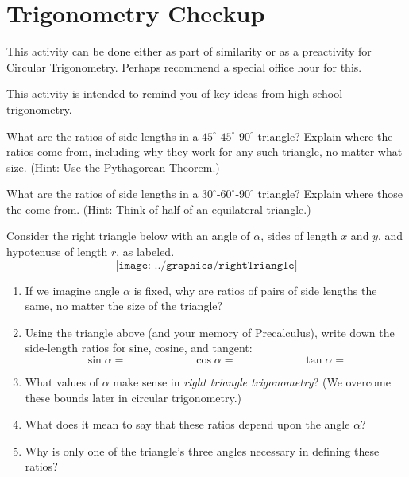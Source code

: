 \newpage 

\section{Trigonometry Checkup}
\begin{teachingnote}
This activity can be done either as part of similarity or as a preactivity for Circular Trigonometry.  Perhaps recommend a special office hour for this.  
\end{teachingnote}
This activity is intended to remind you of key ideas from high school trigonometry. 

\begin{prob}
What are the ratios of side lengths in a $45^\circ$-$45^\circ$-$90^\circ$ triangle?  Explain where the ratios come from, including why they work for any such triangle, no matter what size.  (Hint: Use the Pythagorean Theorem.)
\end{prob}

\vspace{0.1in}

\begin{prob}
What are the ratios of side lengths in a $30^\circ$-$60^\circ$-$90^\circ$ triangle?  Explain where those the come from.  (Hint: Think of half of an equilateral triangle.)
\end{prob}

\vspace{0.1in}

\begin{prob}
Consider the right triangle below with an angle of $\alpha$, sides of length $x$ and $y$, and hypotenuse of length $r$, as labeled.  
$$\texttt{[image: ../graphics/rightTriangle]}$$
\begin{enumerate}
\itemsep 12pt
\item If we imagine angle $\alpha$ is fixed, why are ratios of pairs of side lengths the same, no matter the size of the triangle?
\item Using the triangle above (and your memory of Precalculus), write down the side-length ratios for sine, cosine, and tangent:  
$$\sin\alpha = \hspace{1in} \cos\alpha = \hspace{1in} \tan\alpha =$$
\item What values of $\alpha$ make sense in \emph{right triangle trigonometry}?  (We overcome these bounds later in circular trigonometry.)  
\item What does it mean to say that these ratios depend upon the angle $\alpha$?  
\item Why is only one of the triangle's three angles necessary in defining these ratios?  
\end{enumerate}
\end{prob}

